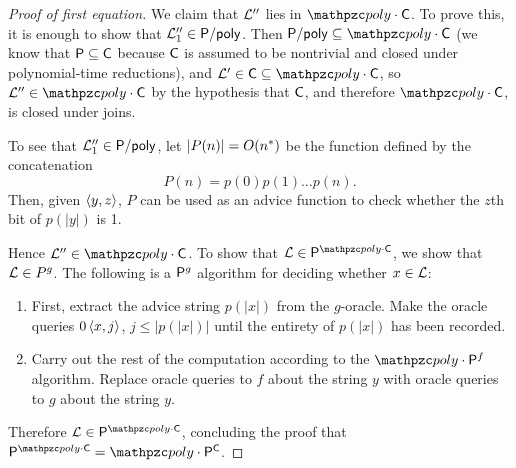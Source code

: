 \begin{proof}[Proof of first equation]
We claim that $\mathcal{L}^{\prime\prime}$ lies in $\cpoly\cdot\sC$. To prove this, it is
enough to show that $\mathcal{L}_1^{\prime\prime}\in\mathsf{P}/\mathsf{poly}$. Then
$\sP/\poly\subseteq\cpoly\cdot\sC$ (we know that $\mathsf{P}\subseteq\mathsf{C}$ because $\mathsf{C}$
is assumed to be nontrivial and closed under polynomial-time reductions), and
$\cL^\prime\in\sC\subseteq\cpoly\cdot\sC$, so
$\cL^{\prime\prime}\in\cpoly\cdot\sC$ by the hypothesis that $\mathsf{C}$, and therefore
$\cpoly\cdot\sC$, is closed under joins.

To see that $\mathcal{L}_1^{\prime\prime}\in\mathsf{P}/\mathsf{poly}$, let $|P(n)|=O(n^*)$ be the
function defined by the concatenation 
\[
P(n)=p(0)p(1)\ldots p(n).
\] 
Then, given $\left\langle y,z\right\rangle$, $P$ can be used as an advice function to check 
whether the $z$th bit of $p(|y|)$ is 1.

Hence $\cL^{\prime\prime}\in\cpoly\cdot\sC$. To show that 
$\cL\in\sP^{\cpoly\cdot\sC}$, we show that $\mathcal{L}\in P^{g}$. The following 
is a $\mathsf{P}^{g}$ algorithm for deciding whether $x\in\mathcal{L}$:
\begin{enumerate}
\item First, extract the advice string $p(|x|)$ from the $g$-oracle. Make
  the oracle queries $0\left\langle x,j\right\rangle$, $j\leq|p(|x|)|$ until the entirety of
  $p(|x|)$ has been recorded.
\item Carry out the rest of the computation according to the $\cpoly\cdot\sP^f$
  algorithm. Replace oracle queries to $f$ about the string $y$ with oracle
  queries to $g$ about the string $y$.
\end{enumerate}
Therefore $\cL\in\sP^{\cpoly\cdot\sC}$, concluding the proof that 
$\sP^{\cpoly\cdot\sC}=\cpoly\cdot\sP^\sC$.
\end{proof}
